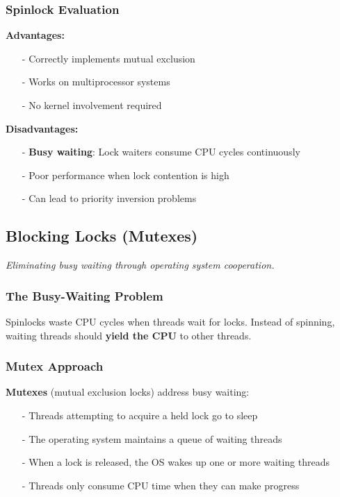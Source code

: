 \documentclass[../../compsys.tex]{subfiles}
\begin{document}
\subsubsection{Spinlock Evaluation}
\textbf{Advantages:}
\begin{itemize}
  \item[-] Correctly implements mutual exclusion
  \item[-] Works on multiprocessor systems
  \item[-] No kernel involvement required
\end{itemize}

\textbf{Disadvantages:}
\begin{itemize}
  \item[-] \textbf{Busy waiting}: Lock waiters consume CPU cycles continuously
  \item[-] Poor performance when lock contention is high
  \item[-] Can lead to priority inversion problems
\end{itemize}

\subsection{Blocking Locks (Mutexes)}
\textit{Eliminating busy waiting through operating system cooperation.}

\subsubsection{The Busy-Waiting Problem}
Spinlocks waste CPU cycles when threads wait for locks. Instead of spinning, waiting threads should \textbf{yield the CPU} to other threads.

\subsubsection{Mutex Approach}
\textbf{Mutexes} (mutual exclusion locks) address busy waiting:
\begin{itemize}
  \item[-] Threads attempting to acquire a held lock go to sleep
  \item[-] The operating system maintains a queue of waiting threads
  \item[-] When a lock is released, the OS wakes up one or more waiting threads
  \item[-] Threads only consume CPU time when they can make progress
\end{itemize}
\end{document}
